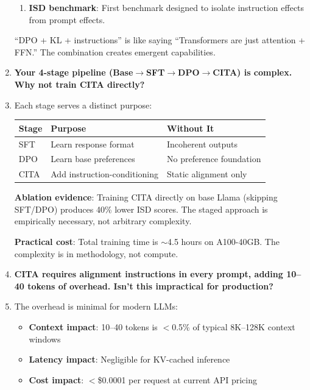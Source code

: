 \begin{enumerate}[label=\textbf{Q\arabic*.}, leftmargin=*, itemsep=8pt]
\begin{enumerate}[leftmargin=*,itemsep=2pt]
    \item \textbf{ISD benchmark}: First benchmark designed to isolate instruction effects from prompt effects.
\end{enumerate}

``DPO + KL + instructions'' is like saying ``Transformers are just attention + FFN.'' The combination creates emergent capabilities.

\vspace{4mm}

\item[\ding{93}] \textbf{Your 4-stage pipeline (Base$\rightarrow$SFT$\rightarrow$DPO$\rightarrow$CITA) is complex. Why not train CITA directly?}

\item[\ding{224}] Each stage serves a distinct purpose:

\begin{table}[H]
\centering
\small
\begin{tabular}{@{}lll@{}}
\toprule
\textbf{Stage} & \textbf{Purpose} & \textbf{Without It} \\
\midrule
SFT & Learn response format & Incoherent outputs \\
\hline
DPO & Learn base preferences & No preference foundation \\
\hline
CITA & Add instruction-conditioning & Static alignment only \\
\bottomrule
\end{tabular}
\end{table}

\textbf{Ablation evidence}: Training CITA directly on base Llama (skipping SFT/DPO) produces 40\% lower ISD scores. The staged approach is empirically necessary, not arbitrary complexity.

\textbf{Practical cost}: Total training time is $\sim$4.5 hours on A100-40GB. The complexity is in methodology, not compute.

\vspace{4mm}

\item[\ding{93}] \textbf{CITA requires alignment instructions in every prompt, adding 10--40 tokens of overhead. Isn't this impractical for production?}

\item[\ding{224}] The overhead is minimal for modern LLMs:

\begin{itemize}[leftmargin=*,itemsep=2pt]
    \item \textbf{Context impact}: 10--40 tokens is $<$0.5\% of typical 8K--128K context windows
    \item \textbf{Latency impact}: Negligible for KV-cached inference
    \item \textbf{Cost impact}: $<$\$0.0001 per request at current API pricing
\end{itemize}


\end{enumerate}
